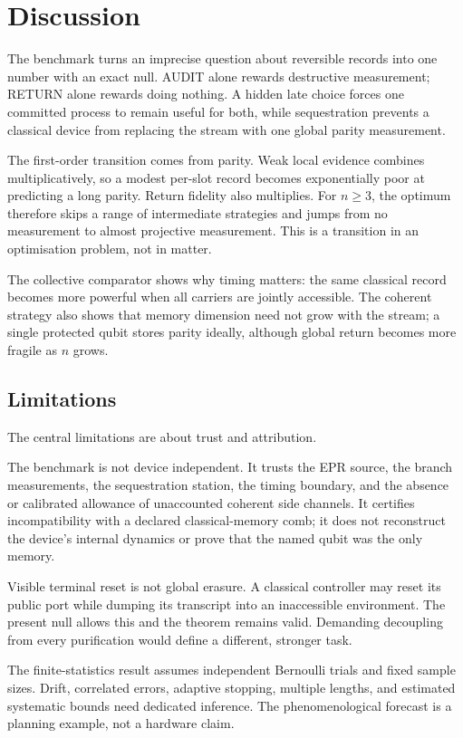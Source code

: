 \section{Discussion}

The benchmark turns an imprecise question about reversible records into one number with an exact null. AUDIT alone rewards destructive measurement; RETURN alone rewards doing nothing. A hidden late choice forces one committed process to remain useful for both, while sequestration prevents a classical device from replacing the stream with one global parity measurement.

The first-order transition comes from parity. Weak local evidence combines multiplicatively, so a modest per-slot record becomes exponentially poor at predicting a long parity. Return fidelity also multiplies. For $n\geq3$, the optimum therefore skips a range of intermediate strategies and jumps from no measurement to almost projective measurement. This is a transition in an optimisation problem, not in matter.

The collective comparator shows why timing matters: the same classical record becomes more powerful when all carriers are jointly accessible. The coherent strategy also shows that memory dimension need not grow with the stream; a single protected qubit stores parity ideally, although global return becomes more fragile as $n$ grows.

\subsection{Limitations}

The central limitations are about trust and attribution.

The benchmark is not device independent. It trusts the EPR source, the branch measurements, the sequestration station, the timing boundary, and the absence or calibrated allowance of unaccounted coherent side channels. It certifies incompatibility with a declared classical-memory comb; it does not reconstruct the device's internal dynamics or prove that the named qubit was the only memory.

Visible terminal reset is not global erasure. A classical controller may reset its public port while dumping its transcript into an inaccessible environment. The present null allows this and the theorem remains valid. Demanding decoupling from every purification would define a different, stronger task.

The finite-statistics result assumes independent Bernoulli trials and fixed sample sizes. Drift, correlated errors, adaptive stopping, multiple lengths, and estimated systematic bounds need dedicated inference. The phenomenological forecast is a planning example, not a hardware claim.

